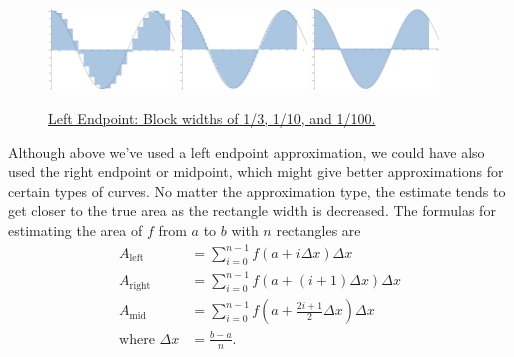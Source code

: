 \begin{figure}[H]
	\label{cos_blocks}
	\centering
	\includegraphics[width = 0.3\textwidth]{./integrals/cos_blocks1.png}
	\includegraphics[width = 0.3\textwidth]{./integrals/cos_blocks2.png}
	\includegraphics[width = 0.3\textwidth]{./integrals/cos_blocks3.png}
	\caption{\hyperref{}{}{}{Left Endpoint: Block widths of 1/3, 1/10, and 1/100.}}
\end{figure}


Although above we've used a left endpoint approximation, we could have also used the right endpoint or midpoint, which might give better approximations for certain types of curves.
No matter the approximation type, the estimate tends to get closer to the true area as the rectangle width is decreased.
The formulas for estimating the area of $f$ from $a$ to $b$ with $n$ rectangles are
\begin{align*}
	A_\text{left} &= \sum_{i=0}^{n-1}{f\left(a+i\Delta x\right)\Delta x} \\
	A_\text{right} &= \sum_{i=0}^{n-1}{f\left(a+(i+1)\Delta x\right)\Delta x} \\
	A_\text{mid} &= \sum_{i=0}^{n-1}{f\left(a+\frac{2i+1}{2}\Delta x\right)\Delta x} \\
	\text{where }\Delta x &= \frac{b-a}{n}.
\end{align*}


